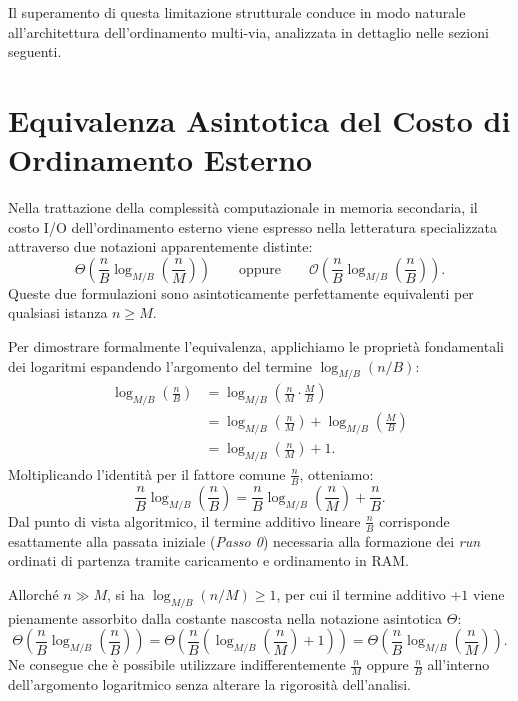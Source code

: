 Il superamento di questa limitazione strutturale conduce in modo naturale all'architettura dell'ordinamento multi-via, analizzata in dettaglio nelle sezioni seguenti.

\FloatBarrier
\section{Equivalenza Asintotica del Costo di Ordinamento Esterno}
\label{sec:sorting-cost-equivalence}

Nella trattazione della complessità computazionale in memoria secondaria, il costo I/O dell'ordinamento esterno viene espresso nella letteratura specializzata~\cite{aggarwal1988} attraverso due notazioni apparentemente distinte:
\begin{equation}
  \Theta\left(\frac{n}{B} \log_{M/B}\left(\frac{n}{M}\right)\right)
  \qquad \text{oppure} \qquad
  \mathcal{O}\left(\frac{n}{B} \log_{M/B}\left(\frac{n}{B}\right)\right).
\end{equation}
Queste due formulazioni sono asintoticamente perfettamente equivalenti per qualsiasi istanza $n \ge M$.

Per dimostrare formalmente l'equivalenza, applichiamo le proprietà fondamentali dei logaritmi espandendo l'argomento del termine $\log_{M/B}(n/B)$:
\begin{align}
  \log_{M/B}\left(\frac{n}{B}\right)
  &= \log_{M/B}\left(\frac{n}{M} \cdot \frac{M}{B}\right) \nonumber \\
  &= \log_{M/B}\left(\frac{n}{M}\right) + \log_{M/B}\left(\frac{M}{B}\right) \nonumber \\
  &= \log_{M/B}\left(\frac{n}{M}\right) + 1.
  \label{eq:log-equivalence}
\end{align}
Moltiplicando l'identità per il fattore comune $\frac{n}{B}$, otteniamo:
\begin{equation}
  \frac{n}{B} \log_{M/B}\left(\frac{n}{B}\right)
  = \frac{n}{B} \log_{M/B}\left(\frac{n}{M}\right) + \frac{n}{B}.
\end{equation}
Dal punto di vista algoritmico, il termine additivo lineare $\frac{n}{B}$ corrisponde esattamente alla passata iniziale (\textit{Passo 0}) necessaria alla formazione dei \textit{run} ordinati di partenza tramite caricamento e ordinamento in RAM. 

Allorché $n \gg M$, si ha $\log_{M/B}(n/M) \ge 1$, per cui il termine additivo $+1$ viene pienamente assorbito dalla costante nascosta nella notazione asintotica $\Theta$:
\begin{equation}
  \Theta\left(\frac{n}{B} \log_{M/B}\left(\frac{n}{B}\right)\right)
  = \Theta\left(\frac{n}{B} \left(\log_{M/B}\left(\frac{n}{M}\right) + 1\right)\right)
  = \Theta\left(\frac{n}{B} \log_{M/B}\left(\frac{n}{M}\right)\right).
\end{equation}
Ne consegue che è possibile utilizzare indifferentemente $\frac{n}{M}$ oppure $\frac{n}{B}$ all'interno dell'argomento logaritmico senza alterare la rigorosità dell'analisi.
